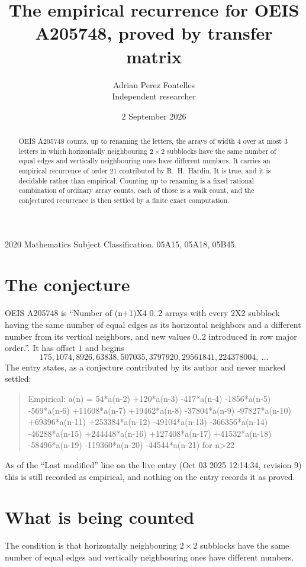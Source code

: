 \documentclass[11pt,a4paper]{article}
\title{The empirical recurrence for OEIS A205748, proved by transfer matrix}
\author{Adrian Perez Fontelles\\ \small Independent researcher}
\date{2 September 2026}
\theoremstyle{plain}
\theoremstyle{definition}
\begin{document}
\maketitle

\begin{abstract}
OEIS A205748 counts, up to renaming the letters, the arrays of width $4$ over at most $3$
letters in which horizontally neighbouring $2\times2$ subblocks have the same number of equal edges and vertically neighbouring ones have different numbers. It carries an empirical recurrence of order $21$ contributed by
R.~H.~Hardin. It is true, and it is decidable rather than empirical. Counting up to renaming is
a fixed rational combination of ordinary array counts, each of those is a walk count, and the
conjectured recurrence is then settled by a finite exact computation.
\end{abstract}

\noindent\small 2020 Mathematics Subject Classification. 05A15, 05A18, 05B45.\normalsize

\section{The conjecture}

OEIS A205748 is ``Number of (n+1)X4 0..2 arrays with every 2X2 subblock having the same number of equal edges as its horizontal neighbors and a different number from its vertical neighbors, and new values 0..2 introduced in row major order.''. It has offset $1$ and begins
\[
175, 1074, 8926, 63838, 507035, 3797920, 29561841, 224378004,\ \dots
\]
The entry states, as a conjecture contributed by its author and never marked settled:
\begin{quote}
Empirical: a(n) = 54*a(n-2) +120*a(n-3) -417*a(n-4) -1856*a(n-5) -569*a(n-6) +11608*a(n-7) +19462*a(n-8) -37804*a(n-9) -97827*a(n-10) +69396*a(n-11) +253384*a(n-12) -49104*a(n-13) -366356*a(n-14) -46288*a(n-15) +244448*a(n-16) +127408*a(n-17) +41532*a(n-18) -58496*a(n-19) -119360*a(n-20) -44544*a(n-21) for n>22
\end{quote}
As of the ``Last modified'' line on the live entry (Oct 03 2025 12:14:34, revision 9) this is still
recorded as empirical, and nothing on the entry records it as proved.

\section{What is being counted}

The condition is that horizontally neighbouring $2\times2$ subblocks have the same number of equal edges and vertically neighbouring ones have different numbers.
\end{document}
